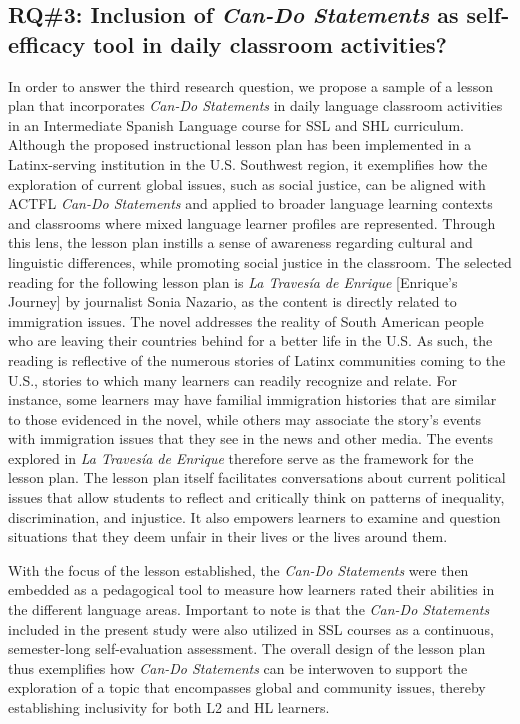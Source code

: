 \documentclass[output=paper]{langscibook}
\begin{document}
\subsection{RQ\#3: Inclusion of \textit{Can-Do Statements} as self-efficacy tool in daily classroom activities?}

In order to answer the third research question, we propose a sample of a lesson plan that incorporates \textit{Can-Do Statements} in daily language classroom activities in an Intermediate Spanish Language course for SSL and SHL curriculum. Although the proposed instructional lesson plan has been implemented in a Latinx-serving institution in the U.S. Southwest region, it exemplifies how the exploration of current global issues, such as social justice, can be aligned with ACTFL \textit{Can-Do Statements} and applied to broader language learning contexts and classrooms where mixed language learner profiles are represented. Through this lens, the lesson plan instills a sense of awareness regarding cultural and linguistic differences, while promoting social justice in the classroom. The selected reading for the following lesson plan is \textit{La Travesía de Enrique} [Enrique’s Journey] by journalist Sonia Nazario, as the content is directly related to immigration issues. The novel addresses the reality of South American people who are leaving their countries behind for a better life in the U.S. As such, the reading is reflective of the numerous stories of Latinx communities coming to the U.S., stories to which many learners can readily recognize and relate. For instance, some learners may have familial immigration histories that are similar to those evidenced in the novel, while others may associate the story’s events with immigration issues that they see in the news and other media. The events explored in \textit{La Travesía de Enrique} therefore serve as the framework for the lesson plan. The lesson plan itself facilitates conversations about current political issues that allow students to reflect and critically think on patterns of inequality, discrimination, and injustice. It also empowers learners to examine and question situations that they deem unfair in their lives or the lives around them.

With the focus of the lesson established, the \textit{Can-Do Statements} were then embedded as a pedagogical tool to measure how learners rated their abilities in the different language areas. Important to note is that the \textit{Can-Do Statements} included in the present study were also utilized in SSL courses as a continuous, semester-long self-evaluation assessment. The overall design of the lesson plan thus exemplifies how \textit{Can-Do Statements} can be interwoven to support the exploration of a topic that encompasses global and community issues, thereby establishing inclusivity for both L2 and HL learners.
\end{document}
